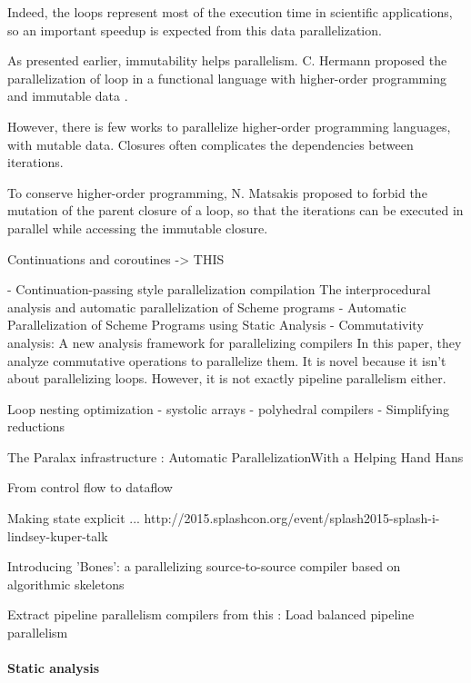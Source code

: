 Indeed, the loops represent most of the execution time in scientific applications, so an important speedup is expected from this data parallelization.

As presented earlier, immutability helps parallelism.
C. Hermann proposed the parallelization of loop in a functional language with higher-order programming and immutable data \cite{Herrmann2000}.


However, there is few works to parallelize higher-order programming languages, with mutable data.
\nt{}
Closures often complicates the dependencies between iterations.

To conserve higher-order programming, N. Matsakis proposed to forbid the mutation of the parent closure of a loop, so that the iterations can be executed in parallel while accessing the immutable closure\cite{Matsakis2012a}.


Continuations and coroutines \cite{Haynes1984}
-> THIS


- Continuation-passing style parallelization compilation \cite{Harrison1989} The interprocedural analysis and automatic parallelization of Scheme programs
- Automatic Parallelization of Scheme Programs using Static Analysis \cite{Nicolay2010}
- Commutativity analysis: A new analysis framework for parallelizing compilers \cite{Rinard1996}
In this paper, they analyze commutative operations to parallelize them.
It is novel because it isn't about parallelizing loops.
However, it is not exactly pipeline parallelism either.


Loop nesting optimization
- systolic arrays
- polyhedral compilers
- Simplifying reductions 

The Paralax infrastructure : Automatic ParallelizationWith a Helping Hand
Hans \cite{Vandierendonck2010a}

From control flow to dataflow \cite{Beck1991}


Making state explicit ... \cite{Fernandez2014a}
http://2015.splashcon.org/event/splash2015-splash-i-lindsey-kuper-talk


Introducing 'Bones': a parallelizing source-to-source compiler based on algorithmic skeletons \cite{Nugteren2012}


Extract pipeline parallelism compilers from this :
Load balanced pipeline parallelism \cite{Kamruzzaman2013}


\paragraph{Static analysis}

